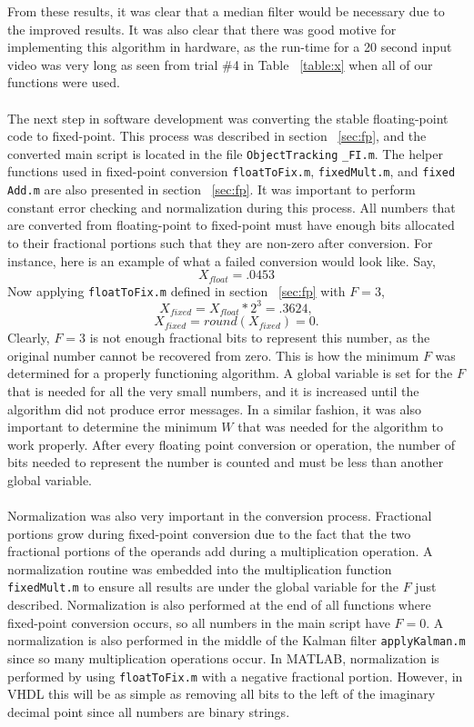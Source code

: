 \documentclass[11pt]{article} %
\begin{document}
\FloatBarrier
\noindent
From these results, it was clear that a median filter would be necessary due to the improved results. It was also clear that there was good motive for implementing this algorithm in hardware, as the run-time for a 20 second input video was very long as seen from trial \#4 in Table ~\ref{table:x} when all of our functions were used. \\\\
The next step in software development was converting the stable floating-point code to fixed-point. This process was described in section ~\ref{sec:fp}, and the converted main script is located in the file \texttt{ObjectTracking} \texttt{\_FI.m}. The helper functions used in fixed-point conversion \texttt{floatToFix.m}, \texttt{fixedMult.m}, and \texttt{fixed} \texttt{Add.m} are also presented in section ~\ref{sec:fp}. It was important to perform constant error checking and normalization during this process. All numbers that are converted from floating-point to fixed-point must have enough bits allocated to their fractional portions such that they are non-zero after conversion. For instance, here is an example of what a failed conversion would look like. Say,
\[
X_{float} = .0453
\]
Now applying \texttt{floatToFix.m} defined in section ~\ref{sec:fp} with $F=3$, 
\[
X_{fixed} = X_{float} * 2^3 = .3624,
\]
\[
X_{fixed} = round(X_{fixed}) = 0.
\]
Clearly, $F=3$ is not enough fractional bits to represent this number, as the original number cannot be recovered from zero. This is how the minimum $F$ was determined for a properly functioning algorithm. A global variable is set for the $F$ that is needed for all the very small numbers, and it is increased until the algorithm did not produce error messages. In a similar fashion, it was also important to determine the minimum $W$ that was needed for the algorithm to work properly. After every floating point conversion or operation, the number of bits needed to represent the number is counted and must be less than another global variable. \\\\
Normalization was also very important in the conversion process. Fractional portions grow during fixed-point conversion due to the fact that the two fractional portions of the operands add during a multiplication operation. A normalization routine was embedded into the multiplication function \texttt{fixedMult.m} to ensure all results are under the global variable for the $F$ just described. Normalization is also performed at the end of all functions where fixed-point conversion occurs, so all numbers in the main script have $F=0$. A normalization is also performed in the middle of the Kalman filter \texttt{applyKalman.m} since so many multiplication operations occur. In MATLAB, normalization is performed by using \texttt{floatToFix.m} with a negative fractional portion. However, in VHDL this will be as simple as removing all bits to the left of the imaginary decimal point since all numbers are binary strings.\\\\
\end{document}
